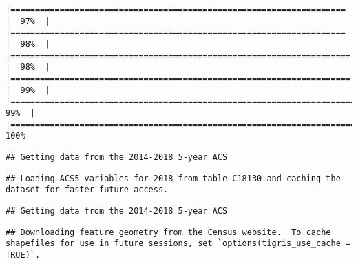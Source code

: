 \documentclass[
]{article}
\begin{document}
\begin{verbatim}
|====================================================================  |  97%  |                                                                              |====================================================================  |  98%  |                                                                              |===================================================================== |  98%  |                                                                              |===================================================================== |  99%  |                                                                              |======================================================================|  99%  |                                                                              |======================================================================| 100%
\end{verbatim}

\begin{verbatim}
## Getting data from the 2014-2018 5-year ACS
\end{verbatim}

\begin{verbatim}
## Loading ACS5 variables for 2018 from table C18130 and caching the dataset for faster future access.
\end{verbatim}

\begin{verbatim}
## Getting data from the 2014-2018 5-year ACS
\end{verbatim}

\begin{verbatim}
## Downloading feature geometry from the Census website.  To cache shapefiles for use in future sessions, set `options(tigris_use_cache = TRUE)`.
\end{verbatim}
\end{document}
